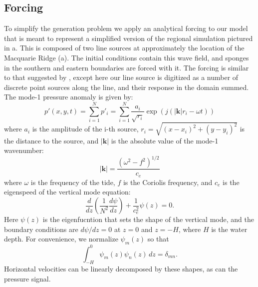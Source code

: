 \documentclass[12pt]{article}
\begin{document}
%
%
%
%
%
%
%

\subsection{Forcing}

To simplify the generation problem we apply an analytical forcing to our model that is meant to represent a simplified version of the regional simulation pictured in a.  This is composed of two line sources at approximately the location of the Macquarie Ridge (a).  The initial conditions contain this wave field, and sponges in the southern and eastern boundaries are forced with it.  The forcing is similar to that suggested by \citet{rainvilleetal10}, except here our line source is digitized as a number of discrete point sources along the line, and their response in the domain summed.  The mode-1 pressure anomaly is given by:
\begin{equation}
  p'(x,y,t)= \sum_{i=1}^{N} p'_i = \sum_{i=1}^{N}  \frac{a_i}{\sqrt{r_i}} \exp\left(j\left(|\mathbf{k}|r_i - \omega t\right)\right)
\end{equation}
where $a_i$ is the amplitude of the i-th source, $r_i=\sqrt{\left(x-x_i\right)^2+\left(y-y_i\right)^2}$ is the distance to the source, and $|\mathbf{k}|$ is the absolute value of the mode-1 wavenumber:
\begin{equation}
  |\mathbf{k}|= \frac{\left(\omega^2-f^2\right)^{1/2}}{c_e}
\end{equation}
where $\omega$ is the frequency of the tide, $f$ is the Coriolis frequency, and $c_e$ is the eigenspeed of the vertical mode equation:
\begin{equation}
  \frac{d}{dz}\left(\frac{1}{N^2}\frac{d\psi}{dz}\right)
 + \frac{1}{c_e^2}\psi(z)=0.
\end{equation}
Here $\psi(z)$ is the eigenfucntion that sets the shape of the vertical mode, and the boundary conditions are $d\psi/dz=0$ at $z=0$ and $z=-H$, where $H$ is the water depth.  For convenience, we normalize $\psi_m(z)$ so that 
\begin{equation}
  \int_{-H}^0 \psi_m(z)\psi_n(z)\, dz = \delta_{mn}.
\end{equation}
Horizontal velocities can be linearly decomposed by these shapes, as can the pressure signal.  
\end{document}

